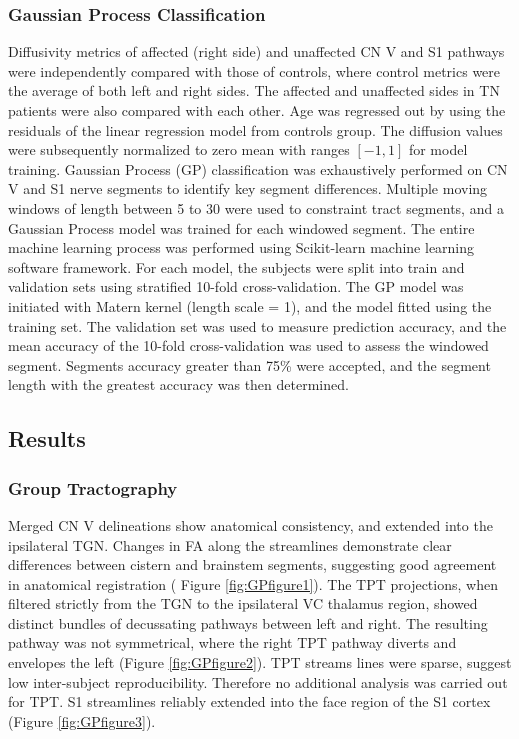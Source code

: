 \subsubsection{Gaussian Process Classification}

Diffusivity metrics of affected (right side) and unaffected CN V and S1 pathways were independently compared with those of controls, where control metrics were the average of both left and right sides. The affected and unaffected sides in TN patients were also compared with each other. 
Age was regressed out by using the residuals of the linear regression model from controls group. The diffusion values were subsequently normalized to zero mean with ranges $[-1, 1]$ for model training. 
Gaussian Process (GP) classification was exhaustively performed on CN V and S1 nerve segments to identify key segment differences. Multiple moving windows of length between 5 to 30 were used to constraint tract segments, and a Gaussian Process model was trained for each windowed segment. The entire machine learning process was performed using Scikit-learn machine learning software framework.
For each model, the subjects were split into train and validation sets using stratified 10-fold cross-validation. The GP model was initiated with Matern kernel (length scale = 1), and the model fitted using the training set. The validation set was used to measure prediction accuracy, and the mean accuracy of the 10-fold cross-validation was used to assess the windowed segment. Segments accuracy greater than 75\% were accepted, and the segment length with the greatest accuracy was then determined. 

\subsection{Results}
\subsubsection{Group Tractography}
Merged CN V delineations show anatomical consistency, and extended into the ipsilateral TGN. Changes in FA along the streamlines demonstrate clear differences between cistern and brainstem segments, suggesting good agreement in anatomical registration ( Figure \ref{fig:GPfigure1}). 
The TPT projections, when filtered strictly from the TGN to the ipsilateral VC thalamus region, showed distinct bundles of decussating pathways between left and right. The resulting pathway was not symmetrical, where the right TPT pathway diverts and envelopes the left (Figure \ref{fig:GPfigure2}). TPT streams lines were sparse, suggest low inter-subject reproducibility. Therefore no additional analysis was carried out for TPT.
S1 streamlines reliably extended into the face region of the S1 cortex (Figure \ref{fig:GPfigure3}). 

